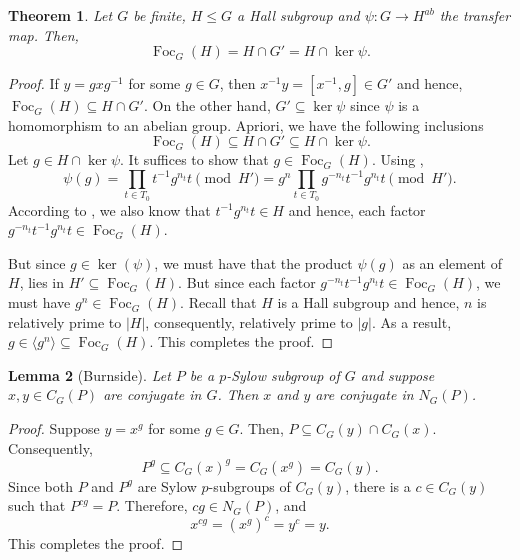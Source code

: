 \documentclass[12pt]{article}
\theoremstyle{thmstyle}
\newtheorem{theorem}{Theorem}[section]
\newtheorem{lemma}[theorem]{Lemma}
\theoremstyle{defstyle}
\renewcommand{\le}{\leqslant}
\newcommand{\Foc}{\operatorname{Foc}}
\begin{document}
\begin{theorem}
    Let $G$ be finite, $H\le G$ a Hall subgroup and $\psi: G\to H^{ab}$ the transfer map. Then, 
    \begin{equation*}
        \Foc_G(H) = H\cap G' = H\cap\ker\psi.
    \end{equation*}
\end{theorem}
\begin{proof}
    If $y = gxg^{-1}$ for some $g\in G$, then $x^{-1}y = [x^{-1}, g]\in G'$ and hence, $\Foc_G(H)\subseteq H\cap G'$. On the other hand, $G'\subseteq\ker\psi$ since $\psi$ is a homomorphism to an abelian group. Apriori, we have the following inclusions
    \begin{equation*}
        \Foc_G(H)\subseteq H\cap G'\subseteq H\cap\ker\psi.
    \end{equation*}
    Let $g\in H\cap\ker\psi$. It suffices to show that $g\in\Foc_G(H)$. Using , 
    \begin{equation*}
        \psi(g) = \prod_{t\in T_0} t^{-1}g^{n_t}t\pmod{H'} = g^n\prod_{t\in T_0}g^{-n_t}t^{-1}g^{n_t}t\pmod{H'}.
    \end{equation*}
    According to , we also know that $t^{-1}g^{n_t}t\in H$ and hence, each factor $g^{-n_t}t^{-1}g^{n_t}t\in\Foc_G(H)$. 
    
    But since $g\in\ker(\psi)$, we must have that the product $\psi(g)$ as an element of $H$, lies in $H'\subseteq\Foc_G(H)$. But since each factor $g^{-n_t}t^{-1}g^{n_t}t\in\Foc_G(H)$, we must have $g^n\in\Foc_G(H)$. Recall that $H$ is a Hall subgroup and hence, $n$ is relatively prime to $|H|$, consequently, relatively prime to $|g|$. As a result, $g\in\langle g^n\rangle\subseteq\Foc_G(H)$. This completes the proof.
\end{proof}

\begin{lemma}[Burnside]
    Let $P$ be a $p$-Sylow subgroup of $G$ and suppose $x,y\in C_G(P)$ are conjugate in $G$. Then $x$ and $y$ are conjugate in $N_G(P)$.
\end{lemma}
\begin{proof}
    Suppose $y = x^g$ for some $g\in G$. Then, $P\subseteq C_G(y)\cap C_G(x)$. Consequently, 
    \begin{equation*}
        P^g\subseteq C_G(x)^g = C_G(x^g) = C_G(y).
    \end{equation*}
    Since both $P$ and $P^g$ are Sylow $p$-subgroups of $C_G(y)$, there is a $c\in C_G(y)$ such that $P^{cg} = P$. Therefore, $cg\in N_G(P)$, and 
    \begin{equation*}
        x^{cg} = (x^g)^c = y^c = y.
    \end{equation*}
    This completes the proof.
\end{proof}
\end{document}
